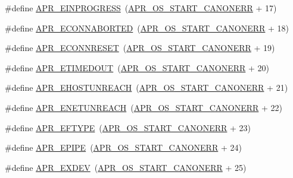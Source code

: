\begin{DoxyCompactItemize}
\item 
\#define \hyperlink{group___a_p_r___error_ga5c311361f4f68f289c90f3cdfd77eb79}{A\-P\-R\-\_\-\-E\-I\-N\-P\-R\-O\-G\-R\-E\-S\-S}~(\hyperlink{group__apr__errno_ga7bca957c11b80b31cb54b0d2cbe9e025}{A\-P\-R\-\_\-\-O\-S\-\_\-\-S\-T\-A\-R\-T\-\_\-\-C\-A\-N\-O\-N\-E\-R\-R} + 17)
\item 
\#define \hyperlink{group___a_p_r___error_ga9458da18e0ee46a5d37c9cdfdc43efd2}{A\-P\-R\-\_\-\-E\-C\-O\-N\-N\-A\-B\-O\-R\-T\-E\-D}~(\hyperlink{group__apr__errno_ga7bca957c11b80b31cb54b0d2cbe9e025}{A\-P\-R\-\_\-\-O\-S\-\_\-\-S\-T\-A\-R\-T\-\_\-\-C\-A\-N\-O\-N\-E\-R\-R} + 18)
\item 
\#define \hyperlink{group___a_p_r___error_ga264bfe2056e917728e9ed060b58869c2}{A\-P\-R\-\_\-\-E\-C\-O\-N\-N\-R\-E\-S\-E\-T}~(\hyperlink{group__apr__errno_ga7bca957c11b80b31cb54b0d2cbe9e025}{A\-P\-R\-\_\-\-O\-S\-\_\-\-S\-T\-A\-R\-T\-\_\-\-C\-A\-N\-O\-N\-E\-R\-R} + 19)
\item 
\#define \hyperlink{group___a_p_r___error_ga6aeccbe9accb34f0adc1cb1ab9a82a8d}{A\-P\-R\-\_\-\-E\-T\-I\-M\-E\-D\-O\-U\-T}~(\hyperlink{group__apr__errno_ga7bca957c11b80b31cb54b0d2cbe9e025}{A\-P\-R\-\_\-\-O\-S\-\_\-\-S\-T\-A\-R\-T\-\_\-\-C\-A\-N\-O\-N\-E\-R\-R} + 20)
\item 
\#define \hyperlink{group___a_p_r___error_ga489b0c02fa7cf33ed6d698d385661f86}{A\-P\-R\-\_\-\-E\-H\-O\-S\-T\-U\-N\-R\-E\-A\-C\-H}~(\hyperlink{group__apr__errno_ga7bca957c11b80b31cb54b0d2cbe9e025}{A\-P\-R\-\_\-\-O\-S\-\_\-\-S\-T\-A\-R\-T\-\_\-\-C\-A\-N\-O\-N\-E\-R\-R} + 21)
\item 
\#define \hyperlink{group___a_p_r___error_gab9b7124a88817d1b69cdef059f7dc689}{A\-P\-R\-\_\-\-E\-N\-E\-T\-U\-N\-R\-E\-A\-C\-H}~(\hyperlink{group__apr__errno_ga7bca957c11b80b31cb54b0d2cbe9e025}{A\-P\-R\-\_\-\-O\-S\-\_\-\-S\-T\-A\-R\-T\-\_\-\-C\-A\-N\-O\-N\-E\-R\-R} + 22)
\item 
\#define \hyperlink{group___a_p_r___error_gac358701354d03c37e3f0de12ed6d9afc}{A\-P\-R\-\_\-\-E\-F\-T\-Y\-P\-E}~(\hyperlink{group__apr__errno_ga7bca957c11b80b31cb54b0d2cbe9e025}{A\-P\-R\-\_\-\-O\-S\-\_\-\-S\-T\-A\-R\-T\-\_\-\-C\-A\-N\-O\-N\-E\-R\-R} + 23)
\item 
\#define \hyperlink{group___a_p_r___error_gae985330e30e374714ff1742485597f5d}{A\-P\-R\-\_\-\-E\-P\-I\-P\-E}~(\hyperlink{group__apr__errno_ga7bca957c11b80b31cb54b0d2cbe9e025}{A\-P\-R\-\_\-\-O\-S\-\_\-\-S\-T\-A\-R\-T\-\_\-\-C\-A\-N\-O\-N\-E\-R\-R} + 24)
\item 
\#define \hyperlink{group___a_p_r___error_ga0562023bd8ebe580b9bbb9f7b04d3f5d}{A\-P\-R\-\_\-\-E\-X\-D\-E\-V}~(\hyperlink{group__apr__errno_ga7bca957c11b80b31cb54b0d2cbe9e025}{A\-P\-R\-\_\-\-O\-S\-\_\-\-S\-T\-A\-R\-T\-\_\-\-C\-A\-N\-O\-N\-E\-R\-R} + 25)

\end{DoxyCompactItemize}
